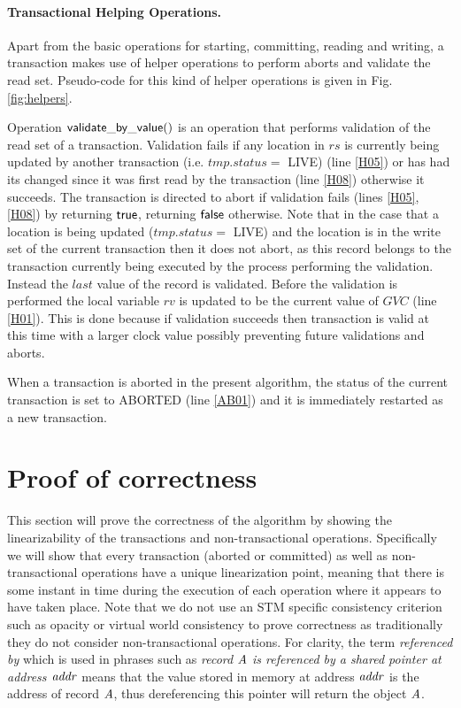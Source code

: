 \paragraph{Transactional Helping Operations.} 
Apart from the basic operations for starting, committing, 
reading and writing, a transaction makes use of helper 
operations to perform aborts and validate the read set.
 Pseudo-code for this kind of helper operations 
is given in Fig. \ref{fig:helpers}.

Operation ${\sf validate\_by\_value()}$ is an operation that performs 
validation of the read set of a transaction. 
Validation fails 
if any location in $\mathit{rs}$ is 
currently being updated by another transaction (i.e. $\mathit{tmp.status} = $ LIVE) (line \ref{H05})
or has had its changed since it was first read by the transaction (line \ref{H08})
otherwise it succeeds.
The transaction is directed to abort if validation fails (lines \ref{H05}, \ref{H08}) by returning $\sf{true}$,
returning $\sf{false}$ otherwise.
Note that in the case that a location is being updated ($\mathit{tmp.status} = $ LIVE) and the location
is in the write set of the current transaction then it does not abort, as this record belongs to the transaction
currently being executed by the process performing the validation.
Instead the $\mathit{last}$ value of the record is validated.
Before the validation is performed the local variable $\mathit{rv}$ is updated
to be the current value of $\mathit{GVC}$ (line \ref{H01}).
This is done because if validation succeeds then transaction is valid at this time
with a larger
clock value possibly preventing future validations and aborts.

When a transaction is aborted in the present algorithm, 
the status of the current transaction is set to ABORTED (line \ref{AB01}) and
it is immediately restarted as a new transaction.





\section{Proof of correctness}
This section will prove the correctness of the algorithm by showing the linearizability
of the transactions and non-transactional operations.
Specifically we will show that every transaction (aborted or committed) as well
as non-transactional operations have a unique linearization point, meaning that
there is some instant in time during the execution of each operation where it
appears to have taken place.
Note that we do not use an STM specific consistency criterion
such as opacity or virtual world consistency to prove correctness as traditionally they do not consider
non-transactional operations.
For clarity, the term \emph{referenced by} which is used in phrases such as \emph{record $\ms{A}$ is referenced by
a shared pointer at address $\ms{addr}$} means that the value stored in memory at address $\ms{addr}$
is the address of record $\ms{A}$, thus dereferencing this pointer will return the object $\ms{A}$.

